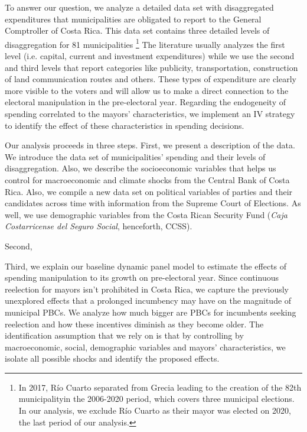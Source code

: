 To answer our question, we analyze a detailed data set with disaggregated expenditures that municipalities are obligated to report to the General Comptroller of Costa Rica. This data set contains three detailed levels of disaggregation for 81 municipalities \footnote{In 2017, Río Cuarto separated from Grecia leading to the creation of the 82th municipalityin the 2006-2020 period, which covers three municipal elections. In our analysis, we exclude Río Cuarto as their mayor was elected on 2020, the last period of our analysis. }  The literature usually analyzes the first level (i.e. capital, current and investment expenditures) while we use the second and third levels that report categories like publicity, transportation, construction of land communication routes and others. These types of expenditure are clearly more visible to the voters and will allow us to make a direct connection to the electoral manipulation in the pre-electoral year. Regarding the endogeneity of spending correlated to the mayors' characteristics, we implement an IV strategy to identify the effect of these characteristics in spending decisions. 

Our analysis proceeds in three steps. First, we present a description of the data. We introduce the data set of municipalities' spending and their levels of disaggregation. Also, we describe the socioeconomic variables that helps us control for macroeconomic and climate shocks from the Central Bank of Costa Rica. Also, we compile a new data set on political variables of parties and their candidates across time with information from the Supreme Court of Elections. As well, we use demographic variables from the Costa Rican Security Fund (\textit{Caja Costarricense del Seguro Social}, henceforth, CCSS). 

Second, 

Third, we explain our baseline dynamic panel model to estimate the effects of spending manipulation to its growth on pre-electoral year. Since continuous reelection for mayors isn't prohibited in Costa Rica, we capture the previously unexplored effects that a prolonged incumbency may have on the magnitude of municipal PBCs. We analyze how much bigger are PBCs for incumbents seeking reelection and how these incentives diminish as they become older. The identification assumption that we rely on is that by controlling by macroeconomic, social, demographic variables and mayors' characteristics, we isolate all possible shocks and identify the proposed effects. 
